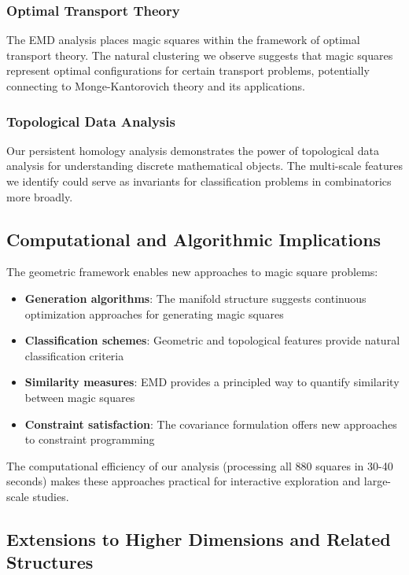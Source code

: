 \subsubsection{Optimal Transport Theory}

The EMD analysis places magic squares within the framework of optimal transport theory. The natural clustering we observe suggests that magic squares represent optimal configurations for certain transport problems, potentially connecting to Monge-Kantorovich theory and its applications.

\subsubsection{Topological Data Analysis}

Our persistent homology analysis demonstrates the power of topological data analysis for understanding discrete mathematical objects. The multi-scale features we identify could serve as invariants for classification problems in combinatorics more broadly.

\subsection{Computational and Algorithmic Implications}

The geometric framework enables new approaches to magic square problems:

\begin{itemize}
    \item \textbf{Generation algorithms}: The manifold structure suggests continuous optimization approaches for generating magic squares
    \item \textbf{Classification schemes}: Geometric and topological features provide natural classification criteria
    \item \textbf{Similarity measures}: EMD provides a principled way to quantify similarity between magic squares
    \item \textbf{Constraint satisfaction}: The covariance formulation offers new approaches to constraint programming
\end{itemize}

The computational efficiency of our analysis (processing all 880 squares in 30-40 seconds) makes these approaches practical for interactive exploration and large-scale studies.

\subsection{Extensions to Higher Dimensions and Related Structures}

